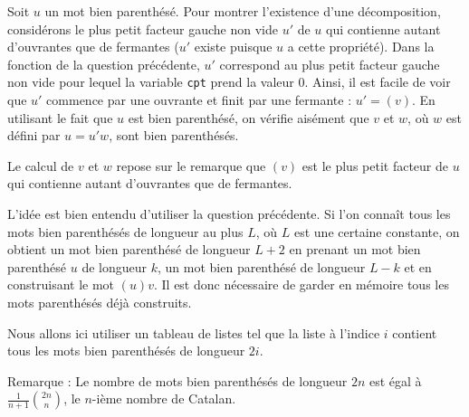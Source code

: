 Soit $u$ un mot bien parenthésé. Pour montrer l'existence d'une décomposition, considérons le plus petit facteur gauche non vide $u'$ de $u$ qui contienne autant d'ouvrantes que de fermantes ($u'$ existe puisque $u$ a cette propriété). Dans la fonction de la question précédente, $u'$ correspond au plus petit facteur gauche non vide pour lequel la variable \texttt{cpt} prend la valeur 0. Ainsi, il est facile de voir que $u'$ commence par une ouvrante et finit par une fermante : $u'=(v)$. En utilisant le fait que $u$ est bien parenthésé, on vérifie aisément que $v$ et $w$, où $w$ est défini par $u=u'w$, sont bien parenthésés.
\medskip

Le calcul de $v$ et $w$ repose sur le remarque que $(v)$ est le plus petit facteur de $u$ qui contienne autant d'ouvrantes que de fermantes.



\Q
L'idée est bien entendu d'utiliser la question précédente. Si l'on connaît tous les mots bien parenthésés de longueur au plus $L$, où $L$ est une certaine constante, on obtient un mot bien parenthésé de longueur $L+2$ en prenant un mot bien parenthésé $u$ de longueur $k$, un mot bien parenthésé de longueur $L-k$ et en construisant le mot $(u)v$. Il est donc nécessaire de garder en mémoire tous les mots parenthésés déjà construits.
\medskip

Nous allons ici utiliser un tableau de listes tel que la liste à l'indice $i$ contient tous les mots bien parenthésés de longueur $2i$.



Remarque : Le nombre de mots bien parenthésés de longueur $2n$ est égal à $\frac{1}{n+1}\binom{2n}{n}$, le $n$-ième nombre de Catalan.
\bigskip

\Fin
